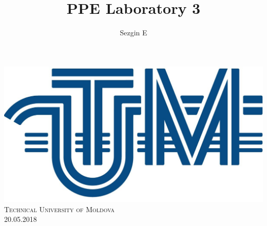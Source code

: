 \documentclass[12pt]{article}
\title{PPE Laboratory 3}
\author{Sezgin E}
\begin{document}
        
        
        \begin{titlepage}
                \centering
                \vspace*{0.5 cm}
                \includegraphics[scale = 0.11]{LOGO_UTM.jpg}\\[1.0 cm]	%
                \textsc{\LARGE Technical University of Moldova}\\[2.0 cm]%
                \textsc{\Large 20.05.2018}\\[0.5 cm]		%


\end{titlepage}
\end{document}

